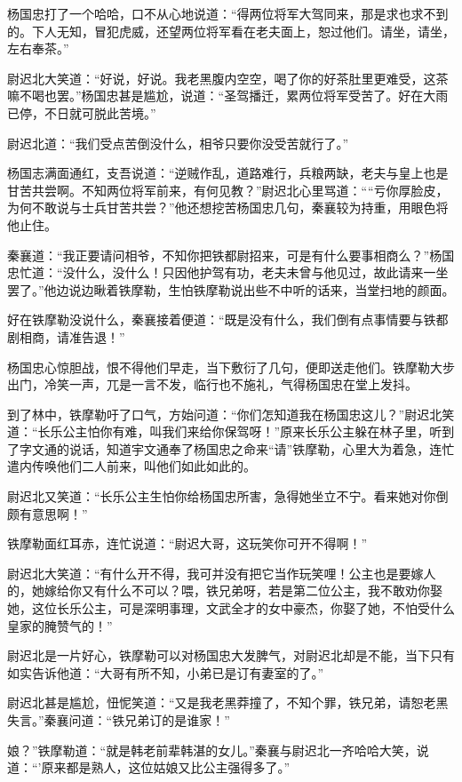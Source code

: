\documentclass[12pt,oneside]{book}
\begin{document}
杨国忠打了一个哈哈，口不从心地说道：``得两位将军大驾同来，那是求也求不到的。下人无知，冒犯虎威，还望两位将军看在老夫面上，恕过他们。请坐，请坐，左右奉茶。''

尉迟北大笑道：``好说，好说。我老黑腹内空空，喝了你的好茶肚里更难受，这茶嘛不喝也罢。''杨国忠甚是尴尬，说道：``圣驾播迁，累两位将军受苦了。好在大雨已停，不日就可脱此苦境。''

尉迟北道：``我们受点苦倒没什么，相爷只要你没受苦就行了。''

杨国志满面通红，支吾说道：``逆贼作乱，道路难行，兵粮两缺，老夫与皇上也是甘苦共尝啊。不知两位将军前来，有何见教？''尉迟北心里骂道：````亏你厚脸皮，为何不敢说与士兵甘苦共尝？''他还想挖苦杨国忠几句，秦襄较为持重，用眼色将他止住。

秦襄道：``我正要请问相爷，不知你把铁都尉招来，可是有什么要事相商么？''杨国忠忙道：``没什么，没什么！只因他护驾有功，老夫未曾与他见过，故此请来一坐罢了。''他边说边瞅着铁摩勒，生怕铁摩勒说出些不中听的话来，当堂扫地的颜面。

好在铁摩勒没说什么，秦襄接着便道：``既是没有什么，我们倒有点事情要与铁都剧相商，请准告退！''

杨国忠心惊胆战，恨不得他们早走，当下敷衍了几句，便即送走他们。铁摩勒大步出门，冷笑一声，兀是一言不发，临行也不施礼，气得杨国忠在堂上发抖。

到了林中，铁摩勒吁了口气，方始问道：``你们怎知道我在杨国忠这儿？''尉迟北笑道：``长乐公主怕你有难，叫我们来给你保驾呀！''原来长乐公主躲在林子里，听到了字文通的说话，知道宇文通奉了杨国忠之命来``请''铁摩勒，心里大为着急，连忙遣内传唤他们二人前来，叫他们如此如此的。

尉迟北又笑道：``长乐公主生怕你给杨国忠所害，急得她坐立不宁。看来她对你倒颇有意思啊！''

铁摩勒面红耳赤，连忙说道：``尉迟大哥，这玩笑你可开不得啊！''

尉迟北大笑道：``有什么开不得，我可并没有把它当作玩笑哩！公主也是要嫁人的，她嫁给你又有什么不可以？喂，铁兄弟呀，若是第二位公主，我不敢劝你娶她，这位长乐公主，可是深明事理，文武全才的女中豪杰，你娶了她，不怕受什么皇家的腌赞气的！''

尉迟北是一片好心，铁摩勒可以对杨国忠大发脾气，对尉迟北却是不能，当下只有如实告诉他道：``大哥有所不知，小弟已是订有妻室的了。''

尉迟北甚是尴尬，忸怩笑道：``又是我老黑莽撞了，不知个罪，铁兄弟，请恕老黑失言。''秦襄问道：``铁兄弟订的是谁家！''

娘？''铁摩勒道：``就是韩老前辈韩湛的女儿。''秦襄与尉迟北一齐哈哈大笑，说道：``'原来都是熟人，这位姑娘又比公主强得多了。''
\end{document}
